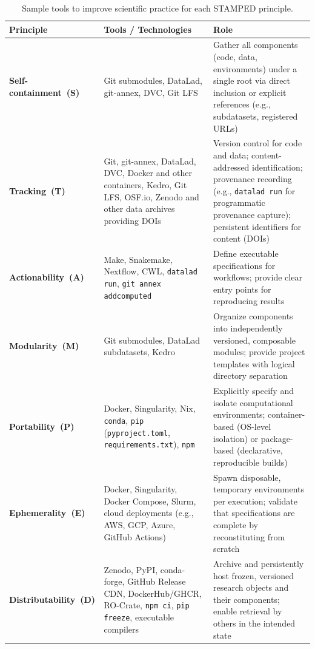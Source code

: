 \documentclass{article}
\begin{document}
\begin{table}[htbp]
\centering
\caption{Sample tools to improve scientific practice for each STAMPED principle.}
\label{tab:stamped-tools}
\begin{tabular}{|l|p{}|p{}|}
\hline
\textbf{Principle} & \textbf{Tools / Technologies} & \textbf{Role} \\
\hline
\textbf{Self-containment~(S)} &
Git submodules, DataLad, git-annex, DVC, Git LFS &
Gather all components (code, data, environments) under a single root via direct inclusion or explicit references (e.g., subdatasets, registered URLs) \\
\hline
\textbf{Tracking~(T)} &
Git, git-annex, DataLad, DVC, Docker and other containers, Kedro, Git LFS, OSF.io, Zenodo and other data archives providing DOIs &
Version control for code and data; content-addressed identification; provenance recording (e.g., \texttt{datalad run} for programmatic provenance capture); persistent identifiers for content (DOIs) \\
\hline
\textbf{Actionability~(A)} &
Make, Snakemake, Nextflow, CWL, \texttt{datalad run}, \texttt{git annex addcomputed} &
Define executable specifications for workflows; provide clear entry points for reproducing results \\
\hline
\textbf{Modularity~(M)} &
Git submodules, DataLad subdatasets, Kedro &
Organize components into independently versioned, composable modules; provide project templates with logical directory separation \\
\hline
\textbf{Portability~(P)} &
Docker, Singularity, Nix, \texttt{conda}, \texttt{pip} (\texttt{pyproject.toml}, \texttt{requirements.txt}), \texttt{npm} &
Explicitly specify and isolate computational environments; container-based (OS-level isolation) or package-based (declarative, reproducible builds) \\
\hline
\textbf{Ephemerality~(E)} &
Docker, Singularity, Docker Compose, Slurm, cloud deployments (e.g., AWS, GCP, Azure, GitHub Actions) &
Spawn disposable, temporary environments per execution; validate that specifications are complete by reconstituting from scratch \\
\hline
\textbf{Distributability~(D)} &
Zenodo, PyPI, conda-forge, GitHub Release CDN, DockerHub/GHCR, RO-Crate, \texttt{npm ci}, \texttt{pip freeze}, executable compilers &
Archive and persistently host frozen, versioned research objects and their components; enable retrieval by others in the intended state \\
\hline
\end{tabular}
\end{table}
\end{document}
